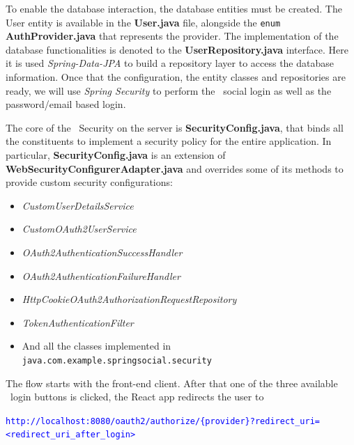 To enable the database interaction, the database entities must be created. The User entity is available in the \textbf{User.java} file, alongside the \texttt{enum} \textbf{AuthProvider.java} that represents the provider. The implementation of the database functionalities is denoted to the \textbf{UserRepository.java} interface. Here it is used \textit{Spring-Data-JPA} to build a repository layer to access the database information.
Once that the configuration, the entity classes and repositories are ready, we will use \textit{Spring Security} \cite{sprsec} to perform the \oauth\ social login as well as the password/email based login.

The core of the \oauth\ Security on the server is \textbf{SecurityConfig.java}, that binds all the constituents to implement a security policy for the entire application. In particular, \textbf{SecurityConfig.java} is an extension of \textbf{WebSecurityConfigurerAdapter.java} and overrides some of its methods to provide custom security configurations:

\begin{itemize}
    \item \textit{CustomUserDetailsService}
    \item \textit{CustomOAuth2UserService}
    \item \textit{OAuth2AuthenticationSuccessHandler}
    \item \textit{OAuth2AuthenticationFailureHandler}
    \item \textit{HttpCookieOAuth2AuthorizationRequestRepository}
    \item \textit{TokenAuthenticationFilter}
    \item And all the classes implemented in \texttt{java.com.example.springsocial.security}
\end{itemize}

\noindent The flow starts with the front-end client. After that one of the three available \oauth\ login buttons is clicked, the React app redirects the user to \\

\vspace{0.1cm}

\hypertarget{foo}{}

\textcolor{blue}{\texttt{\footnotesize{http://localhost:8080/oauth2/authorize/\{provider\}?redirect\_uri=<redirect\_uri\_after\_login>}}} \\

\vspace{0.1cm}

